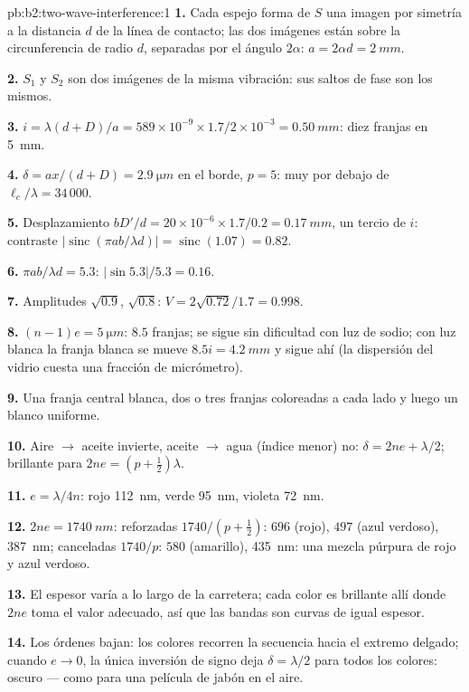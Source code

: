 \begin{solution}{pb:b2:two-wave-interference:1}
\textbf{1.} Cada espejo forma de $S$ una imagen por simetría a la distancia $d$ de
la línea de contacto; las dos imágenes están sobre la circunferencia de radio $d$,
separadas por el ángulo $2\alpha$: $a = 2\alpha d = \qty{2}{mm}$.

\textbf{2.} $S_1$ y $S_2$ son dos imágenes de la misma vibración: sus
saltos de fase son los mismos.

\textbf{3.} $i = \lambda(d + D)/a = 589 \times 10^{-9} \times 1.7/2 \times 10^{-3} = \qty{0.50}{mm}$: diez
franjas en \qty{5}{mm}.

\textbf{4.} $\delta = ax/(d + D) = \qty{2.9}{\micro m}$ en el borde, $p = 5$: muy por debajo de
$\ell_c/\lambda = 34\,000$.

\textbf{5.} Desplazamiento $bD'/d = 20 \times 10^{-6} \times 1.7/0.2 = \qty{0.17}{mm}$, un tercio de
$i$: contraste $|\operatorname{sinc}(\pi ab/\lambda d)| = \operatorname{sinc}(1.07) = 0.82$.

\textbf{6.} $\pi ab/\lambda d = 5.3$: $|\sin5.3|/5.3 = 0.16$.

\textbf{7.} Amplitudes $\sqrt{0.9}$, $\sqrt{0.8}$: $V = 2\sqrt{0.72}/1.7 = 0.998$.

\textbf{8.} $(n - 1)e = \qty{5}{\micro m}$: $8.5$ franjas; se sigue sin dificultad con
luz de sodio; con luz blanca la franja blanca se mueve $8.5i = \qty{4.2}{mm}$
y sigue ahí (la dispersión del vidrio cuesta una fracción de
micrómetro).

\textbf{9.} Una franja central blanca, dos o tres franjas coloreadas a
cada lado y luego un blanco uniforme.

\textbf{10.} Aire $\to$ aceite invierte, aceite $\to$ agua (índice menor) no:
$\delta = 2ne + \lambda/2$; brillante para $2ne = (p + \tfrac12)\lambda$.

\textbf{11.} $e = \lambda/4n$: rojo \qty{112}{nm}, verde \qty{95}{nm}, violeta \qty{72}{nm}.

\textbf{12.} $2ne = \qty{1740}{nm}$: reforzadas $1740/(p + \tfrac12)$: $696$ (rojo), $497$
(azul verdoso), \qty{387}{nm}; canceladas $1740/p$: $580$ (amarillo), \qty{435}{nm}:
una mezcla púrpura de rojo y azul verdoso.

\textbf{13.} El espesor varía a lo largo de la carretera; cada color es brillante
allí donde $2ne$ toma el valor adecuado, así que las bandas son curvas de igual
espesor.

\textbf{14.} Los órdenes bajan: los colores recorren la secuencia
hacia el extremo delgado; cuando $e \to 0$, la única inversión de signo deja
$\delta = \lambda/2$ para todos los colores: oscuro --- como para una película de jabón en el aire.


\end{solution}

